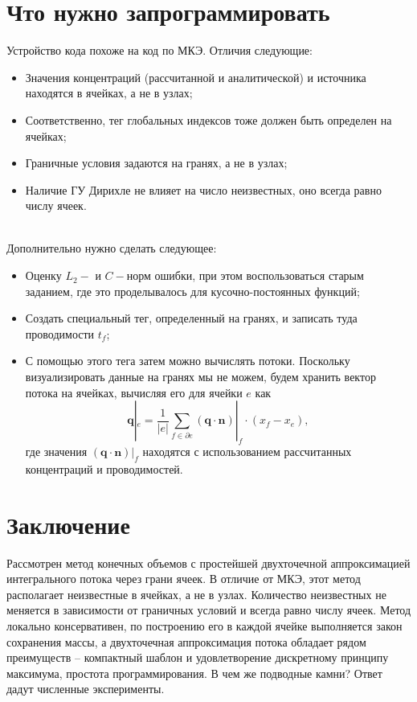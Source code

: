 \documentclass[a4paper, 11pt]{article}
\begin{document}
\section{Что нужно запрограммировать}

Устройство кода похоже на код по МКЭ. Отличия следующие:

\begin{itemize}
	\item Значения концентраций (рассчитанной и аналитической) и источника находятся в ячейках, а не в узлах;
	\item Соответственно, тег глобальных индексов тоже должен быть определен на ячейках;
	\item Граничные условия задаются на гранях, а не в узлах;
	\item Наличие ГУ Дирихле не влияет на число неизвестных, оно всегда равно числу ячеек.
\end{itemize}
~\\
Дополнительно нужно сделать следующее:

\begin{itemize}
	\item Оценку $L_2-$ и $C-$норм ошибки, при этом воспользоваться старым заданием, где это проделывалось для кусочно-постоянных функций;
	\item Создать специальный тег, определенный на гранях, и записать туда проводимости $t_f$;
	\item С помощью этого тега затем можно вычислять потоки. Поскольку визуализировать данные на гранях мы не можем, будем хранить вектор потока на ячейках, вычисляя его для ячейки $e$ как
	\begin{equation*}
	\mathbf{q}|_e = \frac{1}{|e|}\sum_{f \in \partial e}\left(\mathbf{q}\cdot\mathbf{n}\right)|_f \cdot (x_f - x_e),
	\end{equation*}
	где значения $\left(\mathbf{q}\cdot\mathbf{n}\right)|_f $ находятся с использованием рассчитанных концентраций и проводимостей.
\end{itemize}

\section{Заключение}

Рассмотрен метод конечных объемов с простейшей двухточечной аппроксимацией интегрального потока через грани ячеек. В отличие от МКЭ, этот метод располагает неизвестные в ячейках, а не в узлах. Количество неизвестных не меняется в зависимости от граничных условий и всегда равно числу ячеек. Метод локально консервативен, по построению его в каждой ячейке выполняется закон сохранения массы, а двухточечная аппроксимация потока обладает рядом преимуществ -- компактный шаблон и удовлетворение дискретному принципу максимума, простота программирования. В чем же подводные камни? Ответ дадут численные эксперименты.
\end{document}
